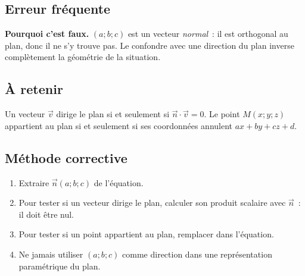 

\subsection*{Erreur fréquente}


\textbf{Pourquoi c'est faux.} $(a;b;c)$ est un vecteur \emph{normal}~: il est
orthogonal au plan, donc il ne s'y trouve pas. Le confondre avec une direction
du plan inverse complètement la géométrie de la situation.


\subsection*{À retenir}

Un vecteur $\vec{v}$ dirige le plan si et seulement si
$\vec{n}\cdot\vec{v}=0$. Le point $M(x;y;z)$ appartient au plan si et
seulement si ses coordonnées annulent $ax+by+cz+d$.

\subsection*{Méthode corrective}

\begin{enumerate}
  \item Extraire $\vec{n}(a;b;c)$ de l'équation.
  \item Pour tester si un vecteur dirige le plan, calculer son produit
        scalaire avec $\vec{n}$~: il doit être nul.
  \item Pour tester si un point appartient au plan, remplacer dans l'équation.
  \item Ne jamais utiliser $(a;b;c)$ comme direction dans une représentation
        paramétrique du plan.
\end{enumerate}

